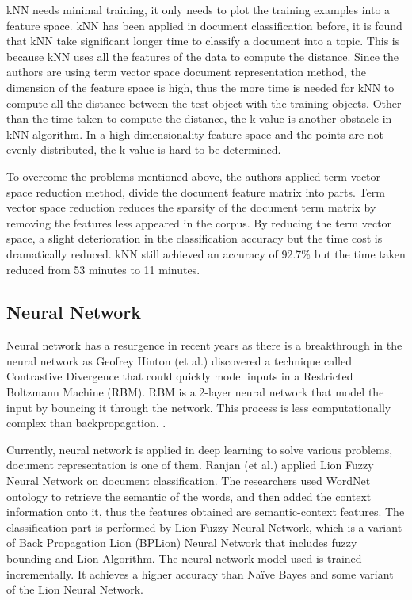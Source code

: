 kNN needs minimal training, it only needs to plot the training examples into a feature space.  
kNN has been applied in document classification before, it is found that kNN take significant 
longer time to classify a document into a topic. This is because kNN uses all the features of the data to compute the distance. Since the authors are using term vector space document 
representation method, the dimension of the feature space is high, thus the more time is needed for kNN to compute all the distance between the test object with the training objects. Other than the time taken to compute the distance, the k value is another obstacle in kNN algorithm. In a high dimensionality feature space and the points are not evenly distributed, the k value is hard to be determined.
	
To overcome the problems mentioned above, the authors applied term vector space reduction method, divide the document feature matrix into parts. Term vector space reduction reduces 
the sparsity of the document term matrix by removing the features less appeared in the corpus. By reducing the term vector space, a slight deterioration in the classification accuracy but the time cost is dramatically reduced. kNN still achieved an accuracy of 92.7\% but the time taken reduced from 53 minutes to 11 minutes. \cite{knnVectorSpaceReduction}
	
\subsection{Neural Network}
Neural network has a resurgence in recent years as there is a breakthrough in the neural network as Geofrey Hinton (et al.) discovered a technique called Contrastive Divergence that could quickly model inputs in a Restricted Boltzmann Machine (RBM). RBM is a 2-layer neural network that model the input by bouncing it through the network. This process is less computationally complex than backpropagation. \cite{nnHinton}.
	
Currently, neural network is applied in deep learning to solve various problems, document representation is one of them. Ranjan (et al.) applied Lion Fuzzy Neural Network on document 
classification. The researchers used WordNet ontology to retrieve the semantic of the words, 
and then added the context information onto it, thus the features obtained are semantic-context features. The classification part is performed by Lion Fuzzy Neural Network, which is a variant of Back Propagation Lion (BPLion) Neural Network that includes fuzzy bounding and Lion Algorithm. The neural network model used is trained incrementally. It achieves a higher accuracy than Naïve Bayes and some variant of the Lion Neural Network. \cite{lionNn}
	
